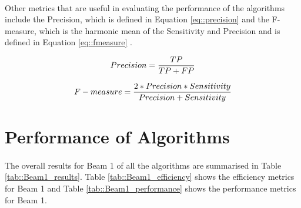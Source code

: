 \paragraph{ }Other metrics that are useful in evaluating the performance of the algorithms include the Precision, which is defined in Equation \ref{eq::precision} and the F-measure, which is the harmonic mean of the Sensitivity and Precision and is defined in Equation \ref{eq::fmeasure} \cite{Danjuma2015}.

\begin{equation}\label{eq::precision}
\centering
Precision=\frac{TP}{TP+FP}
\end{equation}

\begin{equation}\label{eq::fmeasure}
\centering
F-measure=\frac{2*Precision*Sensitivity}{Precision+Sensitivity}
\end{equation}

\section{Performance of Algorithms}

\paragraph{ }The overall results for Beam 1 of all the algorithms are summarised in Table \ref{tab::Beam1_results}. Table \ref{tab::Beam1_efficiency} shows the efficiency metrics for Beam 1 and Table \ref{tab::Beam1_performance} shows the performance metrics for Beam 1.

\begin{table}[H]
	\centering
\caption[Beam 1 Results]{Summary of Results for Beam 1}
\label{tab::Beam1_results}
\end{table}

